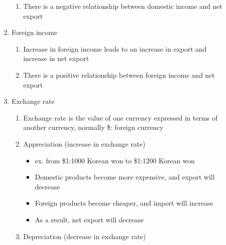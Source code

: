 \documentclass[12pt]{article}
\begin{document}
\begin{enumerate}
\begin{enumerate}
\begin{enumerate}
\begin{enumerate}
                  \item There is a negative relationship between domestic income and net export

                \end{enumerate}

              \item Foreign income

                \begin{enumerate}

                  \item Increase in foreign income leads to an increase in export and increase in net export

                  \item There is a positive relationship between foreign income and net export

                \end{enumerate}

              \item Exchange rate

                \begin{enumerate}

                  \item Exchange rate is the value of one currency expressed in terms of another currency, normally \$: foreign currency

                  \item Appreciation (increase in exchange rate)

                    \begin{itemize}

                      \item ex. from \$1:1000 Korean won to \$1:1200 Korean won

                      \item Domestic products become more expensive, and export will decrease

                      \item Foreign products become cheaper, and import will increase

                      \item As a result, net export will decrease

                    \end{itemize}

                  \item Depreciation (decrease in exchange rate)


\end{enumerate}
\end{enumerate}
\end{enumerate}
\end{enumerate}
\end{document}
